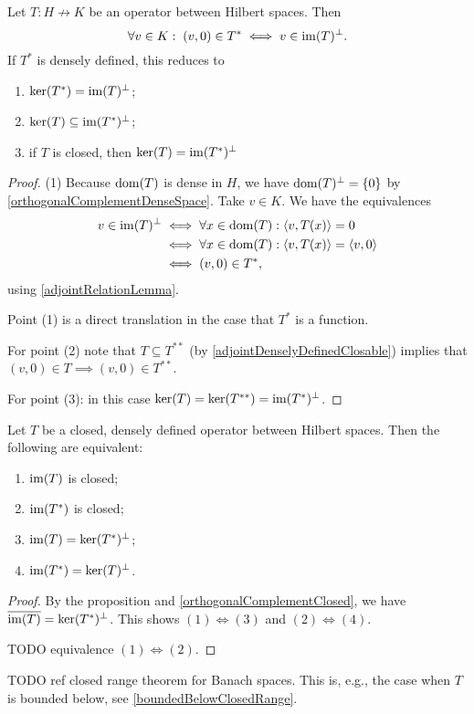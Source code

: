 \begin{proposition} \label{kernelImageAdjoint}
Let $T: H\not\to K$ be an operator between Hilbert spaces. Then
\[ \forall v\in K: \; (v,0)\in T^* \iff v\in \operatorname{im}(T)^\perp. \]
If $T^*$ is densely defined, this reduces to
\begin{enumerate}
\item $\ker(T^*) = \operatorname{im}(T)^\perp$;
\item $\ker(T) \subseteq \operatorname{im}(T^*)^\perp$;
\item if $T$ is closed, then $\ker(T) = \operatorname{im}(T^*)^\perp$
\end{enumerate}
\end{proposition}
\begin{proof}
(1) Because $\operatorname{dom}(T)$ is dense in $H$, we have $\operatorname{dom}(T)^\perp = \{0\}$ by \ref{orthogonalComplementDenseSpace}. Take $v\in K$. We have the equivalences
\begin{align*}
v\in \operatorname{im}(T)^\perp &\iff \forall x \in\operatorname{dom}(T): \left\langle v, T(x) \right\rangle = 0 \\
&\iff \forall x \in\operatorname{dom}(T): \left\langle v, T(x) \right\rangle = \left\langle v, 0 \right\rangle \\
&\iff (v,0)\in T^*,
\end{align*}
using \ref{adjointRelationLemma}.

Point (1) is a direct translation in the case that $T^*$ is a function.

For point (2) note that $T\subseteq T^{**}$ (by \ref{adjointDenselyDefinedClosable}) implies that $(v,0)\in T \implies (v,0)\in T^{**}$.

For point (3): in this case $\ker(T) = \ker(T^{**}) = \operatorname{im}(T^*)^\perp$.
\end{proof}
\begin{corollary}
Let $T$ be a closed, densely defined operator between Hilbert spaces. Then the following are equivalent:
\begin{enumerate}
\item $\operatorname{im}(T)$ is closed;
\item $\operatorname{im}(T^*)$ is closed;
\item $\operatorname{im}(T) = \ker(T^*)^\perp$;
\item $\operatorname{im}(T^*) = \ker(T)^\perp$.
\end{enumerate}
\end{corollary}
\begin{proof}
By the proposition and \ref{orthogonalComplementClosed}, we have $\overline{\operatorname{im}(T)} = \ker(T^*)^\perp$. This shows $(1) \Leftrightarrow (3)$ and $(2) \Leftrightarrow (4)$.

TODO equivalence $(1)\Leftrightarrow (2)$.
\end{proof}
TODO ref closed range theorem for Banach spaces. This is, e.g., the case when $T$ is bounded below, see \ref{boundedBelowClosedRange}.

